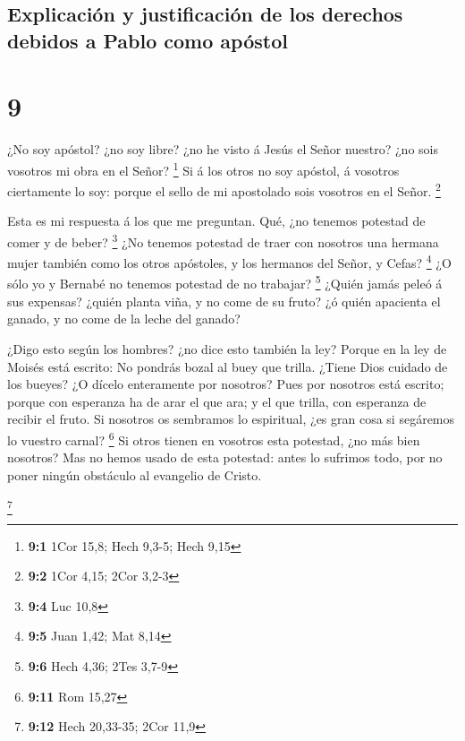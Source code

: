 \hypertarget{explicaciuxf3n-y-justificaciuxf3n-de-los-derechos-debidos-a-pablo-como-apuxf3stol}{%
\subsection{Explicación y justificación de los derechos debidos a Pablo
como
apóstol}\label{explicaciuxf3n-y-justificaciuxf3n-de-los-derechos-debidos-a-pablo-como-apuxf3stol}}

\hypertarget{section-8}{%
\section{9}\label{section-8}}

 ¿No soy apóstol? ¿no soy libre? ¿no he visto á Jesús el
Señor nuestro? ¿no sois vosotros mi obra en el Señor? \footnote{\textbf{9:1}
  1Cor 15,8; Hech 9,3-5; Hech 9,15}  Si á los otros no soy
apóstol, á vosotros ciertamente lo soy: porque el sello de mi apostolado
sois vosotros en el Señor. \footnote{\textbf{9:2} 1Cor 4,15; 2Cor 3,2-3}

 Esta es mi respuesta á los que me preguntan. 
Qué, ¿no tenemos potestad de comer y de beber? \footnote{\textbf{9:4}
  Luc 10,8}  ¿No tenemos potestad de traer con nosotros una
hermana mujer también como los otros apóstoles, y los hermanos del
Señor, y Cefas? \footnote{\textbf{9:5} Juan 1,42; Mat 8,14} 
¿O sólo yo y Bernabé no tenemos potestad de no trabajar? \footnote{\textbf{9:6}
  Hech 4,36; 2Tes 3,7-9}  ¿Quién jamás peleó á sus expensas?
¿quién planta viña, y no come de su fruto? ¿ó quién apacienta el ganado,
y no come de la leche del ganado?

 ¿Digo esto según los hombres? ¿no dice esto también la ley?
 Porque en la ley de Moisés está escrito: No pondrás bozal
al buey que trilla. ¿Tiene Dios cuidado de los bueyes?  ¿O
dícelo enteramente por nosotros? Pues por nosotros está escrito; porque
con esperanza ha de arar el que ara; y el que trilla, con esperanza de
recibir el fruto.  Si nosotros os sembramos lo espiritual,
¿es gran cosa si segáremos lo vuestro carnal? \footnote{\textbf{9:11}
  Rom 15,27}  Si otros tienen en vosotros esta potestad,
¿no más bien nosotros? Mas no hemos usado de esta potestad: antes lo
sufrimos todo, por no poner ningún obstáculo al evangelio de Cristo.

\footnote{\textbf{9:12} Hech 20,33-35; 2Cor 11,9}

